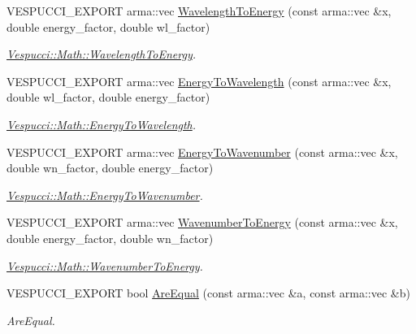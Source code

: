 \begin{DoxyCompactItemize}
V\+E\+S\+P\+U\+C\+C\+I\+\_\+\+E\+X\+P\+O\+RT arma\+::vec \hyperlink{namespace_vespucci_1_1_math_afa3f3afcc0a931b851f3ad0908426b11}{Wavelength\+To\+Energy} (const arma\+::vec \&x, double energy\+\_\+factor, double wl\+\_\+factor)
\begin{DoxyCompactList}\small\item\em \hyperlink{namespace_vespucci_1_1_math_afa3f3afcc0a931b851f3ad0908426b11}{Vespucci\+::\+Math\+::\+Wavelength\+To\+Energy}. \end{DoxyCompactList}\item 
V\+E\+S\+P\+U\+C\+C\+I\+\_\+\+E\+X\+P\+O\+RT arma\+::vec \hyperlink{namespace_vespucci_1_1_math_ae83369e47e53d180309184e5a06c2ec2}{Energy\+To\+Wavelength} (const arma\+::vec \&x, double wl\+\_\+factor, double energy\+\_\+factor)
\begin{DoxyCompactList}\small\item\em \hyperlink{namespace_vespucci_1_1_math_ae83369e47e53d180309184e5a06c2ec2}{Vespucci\+::\+Math\+::\+Energy\+To\+Wavelength}. \end{DoxyCompactList}\item 
V\+E\+S\+P\+U\+C\+C\+I\+\_\+\+E\+X\+P\+O\+RT arma\+::vec \hyperlink{namespace_vespucci_1_1_math_abd5e68dc174313d902a3c330d5d61fea}{Energy\+To\+Wavenumber} (const arma\+::vec \&x, double wn\+\_\+factor, double energy\+\_\+factor)
\begin{DoxyCompactList}\small\item\em \hyperlink{namespace_vespucci_1_1_math_abd5e68dc174313d902a3c330d5d61fea}{Vespucci\+::\+Math\+::\+Energy\+To\+Wavenumber}. \end{DoxyCompactList}\item 
V\+E\+S\+P\+U\+C\+C\+I\+\_\+\+E\+X\+P\+O\+RT arma\+::vec \hyperlink{namespace_vespucci_1_1_math_af2ad8fb2ebde566bab0eec2706714089}{Wavenumber\+To\+Energy} (const arma\+::vec \&x, double energy\+\_\+factor, double wn\+\_\+factor)
\begin{DoxyCompactList}\small\item\em \hyperlink{namespace_vespucci_1_1_math_af2ad8fb2ebde566bab0eec2706714089}{Vespucci\+::\+Math\+::\+Wavenumber\+To\+Energy}. \end{DoxyCompactList}\item 
V\+E\+S\+P\+U\+C\+C\+I\+\_\+\+E\+X\+P\+O\+RT bool \hyperlink{namespace_vespucci_1_1_math_a93670a197cd4ac5ba0bde9c4d0a93015}{Are\+Equal} (const arma\+::vec \&a, const arma\+::vec \&b)
\begin{DoxyCompactList}\small\item\em Are\+Equal. \end{DoxyCompactList}\item 

\end{DoxyCompactItemize}
